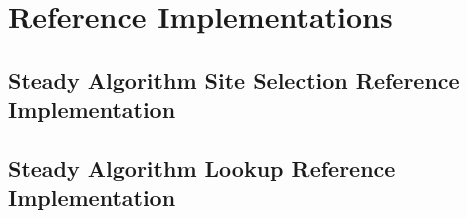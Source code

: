 \section{Reference Implementations}

\subsection{Steady Algorithm Site Selection Reference Implementation}



\subsection{Steady Algorithm Lookup Reference Implementation}




% 


% 


